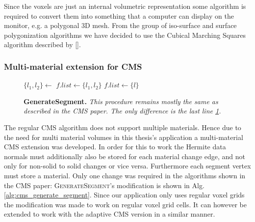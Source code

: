 Since the voxels are just an internal volumetric representation some algorithm is required to convert them into something that a computer can
display on the monitor, e.g. a polygonal 3D mesh. From the group of iso-surface and surface polygonization algorithms we have decided to use the
Cubical Marching Squares algorithm described by [].

\subsubsection{Multi-material extension for CMS}

\begin{wrapfigure}{R}{0.45\textwidth}
\begin{minipage}{0.45\textwidth}
\begin{algorithm}[H]
\caption{\textbf{GenerateSegment.} \textit{This procedure remains mostly the same as described in the CMS paper. The only difference is the last line \ref{algstatement:cms_generate_segment_change}.}}\label{alg:cms_generate_segment}
\begin{algorithmic}[1]
		\State $\{l_1, l_2\} \gets $
		\State $f.list \gets \{l_1, l_2\}$
		\State {}
		\State $f.list \gets \{l\}$
		\State {}
	\EndIf
	\State {} \label{algstatement:cms_generate_segment_change}
\EndProcedure
\end{algorithmic}
\end{algorithm}
\end{minipage}
\end{wrapfigure}

The regular CMS algorithm does not support multiple materials. Hence due to the need for multi material volumes in this thesis's application
a multi-material CMS extension was developed. In order for this to work the Hermite data normals must additionally also be stored for each material change edge, and not only for non-solid
to solid changes or vice versa. Furthermore each segment vertex must store a material.
Only one change was required in the algorithms shown in the CMS paper: \textsc{GenerateSegment}'s modification is shown in Alg. \ref{alg:cms_generate_segment}.
Since our application only uses regular voxel grids the modification was made to work on regular voxel grid cells. It can however be extended to work with the adaptive CMS version
in a similar manner.


